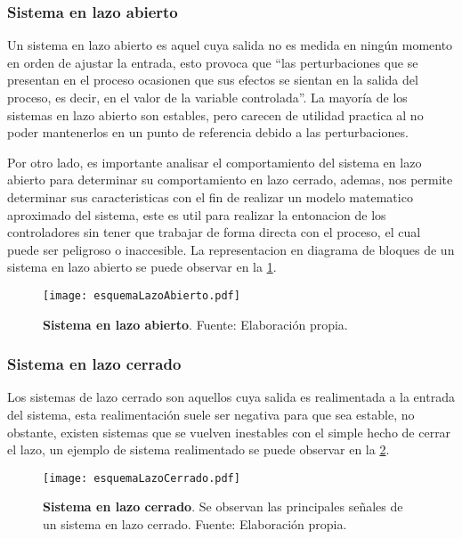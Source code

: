 		\subsubsection{Sistema en lazo abierto}
		
            Un sistema en lazo abierto es aquel cuya salida no es medida en ningún momento en orden de ajustar la entrada, esto provoca que \enquote{las perturbaciones que se presentan en el proceso ocasionen que sus efectos se sientan en la salida del proceso, es decir, en el valor de la variable controlada}\Parencite[p.$\,$350]{maloney2006electronica}. La mayoría de los sistemas en lazo abierto son estables, pero carecen de utilidad practica al no poder mantenerlos en un punto de referencia debido a las perturbaciones.
            
            Por otro lado, es importante analisar el comportamiento del sistema en lazo abierto para determinar su comportamiento en lazo cerrado, ademas, nos permite determinar sus caracteristicas con el fin de realizar un modelo matematico aproximado del sistema, este es util para realizar la entonacion de los controladores sin tener que trabajar de forma directa con el proceso, el cual puede ser peligroso o inaccesible. La representacion en diagrama de bloques de un sistema en lazo abierto se puede observar en la \cref{fig:esquemaLazoAbierto}.
            
            \begin{figure}[htb]
				\centering
				\texttt{[image: esquemaLazoAbierto.pdf]}
				\caption[Ejemplo de un sistema en lazo abierto]{\textbf{Sistema en lazo abierto}. Fuente: Elaboración propia.} 
				\label{fig:esquemaLazoAbierto}
            \end{figure}
        
        \subsubsection{Sistema en lazo cerrado}
		
			Los sistemas de lazo cerrado son aquellos cuya salida es realimentada a la entrada del sistema, esta realimentación suele ser negativa para que sea estable, no obstante, existen sistemas que se vuelven inestables con el simple hecho de cerrar el lazo, un ejemplo de sistema realimentado se puede observar en la \cref{fig:esquemaLazoCerrado}.
			
			\begin{figure}[htb]
				\centering
				\texttt{[image: esquemaLazoCerrado.pdf]}
				\caption[Ejemplo de un sistema en lazo cerrado]{\textbf{Sistema en lazo cerrado}. Se observan las principales señales de un sistema en lazo cerrado. Fuente: Elaboración propia.} 
				\label{fig:esquemaLazoCerrado}
			\end{figure}
			
